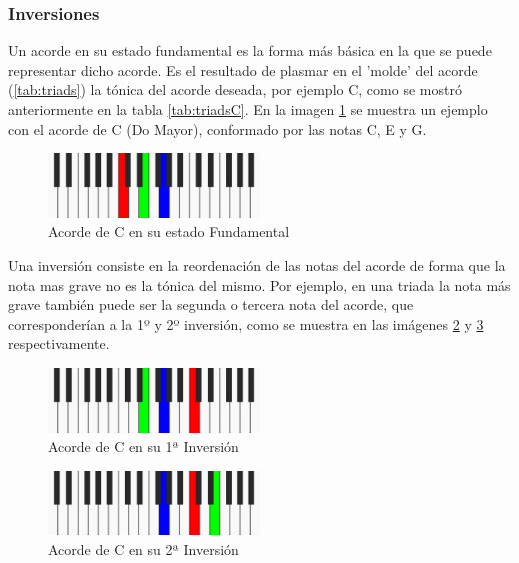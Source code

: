 \subsubsection{Inversiones}\label{subsec:inversiones}


Un acorde en su estado fundamental es la forma más básica en la que se puede representar dicho acorde. Es el resultado de plasmar en el 'molde' del acorde (\ref{tab:triads}) la tónica del acorde deseada, por ejemplo C, como se mostró anteriormente en la tabla \ref{tab:triadsC}. En la imagen \ref{fig:fundamental} se muestra un ejemplo con el acorde de C (Do Mayor), conformado por las notas \textcolor{rojo}{C}, \textcolor{verde}{E} y \textcolor{azul}{G}.

\begin{figure}[h]
    \centering
    \includegraphics[width = 0.5\textwidth]{Imagenes/Bitmap/fundamental.png}
    \caption{Acorde de C en su estado Fundamental}
    \label{fig:fundamental}
\end{figure}

Una inversión consiste en la reordenación de las notas del acorde de forma que la nota mas grave no es la tónica del mismo. Por ejemplo, en una triada la nota más grave también puede ser la segunda o tercera nota del acorde, que corresponderían a la 1º y 2º inversión, como se muestra en las imágenes \ref{fig:inversion1} y \ref{fig:inversion2} respectivamente.

\begin{figure}[h]
    \centering
    \includegraphics[width = 0.5\textwidth]{Imagenes/Bitmap/1era_inversion.png}
    \caption{Acorde de C en su 1ª Inversión}
    \label{fig:inversion1}
\end{figure}

\begin{figure}[h]
    \centering
    \includegraphics[width = 0.5\textwidth]{Imagenes/Bitmap/2da_inversion.png}
    \caption{Acorde de C en su 2ª Inversión}
    \label{fig:inversion2}
\end{figure}

